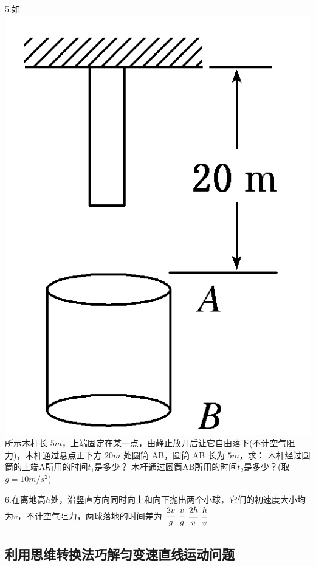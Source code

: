 \documentclass[a4paper,fontset = windows]{ctexbook} %
\begin{document}
\begin{jisuan}
5.如
\includegraphics{../picture/1-2/001.png}
所示木杆长 $5m$，上端固定在某一点，由静止放开后让它自由落下(不计空气阻力)，木杆通过悬点正下方 $20m$ 处圆筒 AB，圆筒 AB 长为 $5m$，求：
\qitem 木杆经过圆筒的上端A所用的时间$t_1$是多少？
\qitem 木杆通过圆筒AB所用的时间$t_2$是多少？(取 $g=10 m/s^2$)

\end{jisuan}

\begin{xuanze}
6.在离地高$h$处，沿竖直方向同时向上和向下抛出两个小球，它们的初速度大小均为$v$，不计空气阻力，两球落地的时间差为
\choice[A] $\cfrac{2v}{g}$
\choice[B] $\cfrac{v}{g}$
\choice[C] $\cfrac{2h}{v}$
\choice[D] $\cfrac{h}{v}$
   
\end{xuanze}

\subsection{利用思维转换法巧解匀变速直线运动问题}
\end{document}
